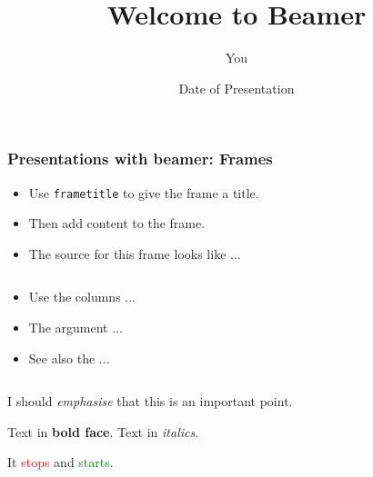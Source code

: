 \documentclass{beamer}
\title{Welcome to Beamer}
\author{You}
\institute{Where You're From}
\date{Date of Presentation}
\begin{document}
\begin{frame}

\tableofcontents[currentsection]
\end{frame}

\begin{frame}

\titlepage
\end{frame}
\begin{frame}
\frametitle{Presentations with beamer: Frames}
\begin{itemize}
\item Use \texttt{frametitle} to give the frame a title.
\item Then add content to the frame.
\item The source for this frame looks like ...
\end{itemize}
\end{frame}

\begin{frame}

\begin{columns}
\begin{column}{0.4\textwidth}
\begin{itemize}
\item Use the columns ...
\item The argument ...
\item See also the ...
\end{itemize}
\end{column}
\begin{column}{0.6\textwidth}
\end{column}
\end{columns}
\end{frame}

\begin{frame}
I should \emph{emphasise} that
this is an \alert{important} point.

Text in \textbf{bold face}.
Text in \textit{italics}.

It \textcolor{red}{stops}
and \textcolor{green}{starts}.

\end{frame}

\end{document}
